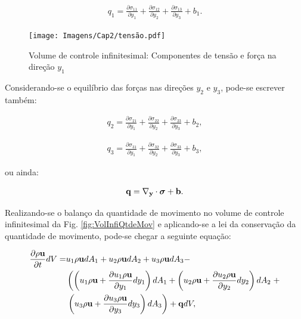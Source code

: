 \documentclass[tese_patricia]{subfiles}%
\begin{document}
\begin{align}
		q_1 =\frac{\partial \sigma_{11}}{\partial y_1} + \frac{\partial \sigma_{12}}{\partial y_2} + \frac{\partial \sigma_{13}}{\partial y_3} + b_{1}.\label{eq:ForçasIntx1} 
\end{align}	

\begin{figure}[htb!]
	\centering 
	\texttt{[image: Imagens/Cap2/tensão.pdf]}	
	\caption{Volume de controle infinitesimal: Componentes de tensão e força na direção $y_1$}
	\label{fig:VolInfiFor}
\end{figure}

Considerando-se o equilíbrio das forças nas direções $y_2$ e $y_3$, pode-se escrever também:

\begin{align}
	q_2 =\frac{\partial \sigma_{21}}{\partial y_1} + \frac{\partial \sigma_{22}}{\partial y_2} + \frac{\partial \sigma_{23}}{\partial y_3} + b_{2}\label{eq:ForçasIntx2},
\end{align}	

\begin{align}
	q_3 =\frac{\partial \sigma_{31}}{\partial y_1} + \frac{\partial \sigma_{32}}{\partial y_2} + \frac{\partial \sigma_{33}}{\partial y_3} + b_{3}\label{eq:ForçasIntx3},
\end{align}

\noindent ou ainda:

\begin{align}
	\mathbf{q} = \mathbf{\nabla_y} \cdot \bm{\sigma} + \mathbf{b}.
\end{align}


Realizando-se o balanço da quantidade de movimento no volume de controle infinitesimal da Fig. \ref{fig:VolInfiQtdeMov} e aplicando-se a lei da conservação da quantidade de movimento, pode-se chegar a seguinte equação:


\begin{align}
	\begin{split}
	\frac{\partial \rho \mathbf{u}}{\partial t}dV =& u_1\rho \mathbf{u} dA_1 + u_2\rho \mathbf{u} dA_2 + u_3 \rho \mathbf{u} dA_3 - \\
	 & \left(\left(u_1 \rho \mathbf{u} + \frac{\partial u_1 \rho \mathbf{u}}{\partial y_1}dy_1 \right)dA_1 + \left(u_2 \rho \mathbf{u} + \frac{\partial u_2 \rho \mathbf{u}}{\partial y_2}dy_2 \right)dA_2 \right. + \\ & \left.   \left(u_3 \rho \mathbf{u} + \frac{\partial u_3 \rho \mathbf{u}}{\partial y_3}dy_3 \right)dA_3\right) + \mathbf{q} dV,
	\label{eq:QtdeMov0} 
	\end{split}
\end{align}	
\end{document}
